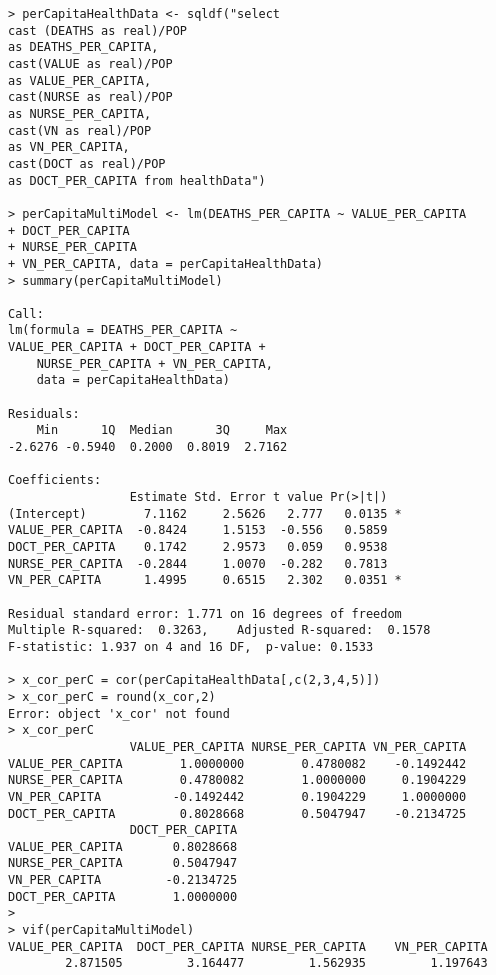 \documentclass[12pt,letterpaper]{article}
\begin{document}
\begin{lstlisting}[label=R Code,caption=Q5(c) R Code Output]
> perCapitaHealthData <- sqldf("select 
cast (DEATHS as real)/POP 
as DEATHS_PER_CAPITA,
cast(VALUE as real)/POP 
as VALUE_PER_CAPITA,
cast(NURSE as real)/POP 
as NURSE_PER_CAPITA,
cast(VN as real)/POP 
as VN_PER_CAPITA,
cast(DOCT as real)/POP 
as DOCT_PER_CAPITA from healthData") 

> perCapitaMultiModel <- lm(DEATHS_PER_CAPITA ~ VALUE_PER_CAPITA 
+ DOCT_PER_CAPITA 
+ NURSE_PER_CAPITA
+ VN_PER_CAPITA, data = perCapitaHealthData)
> summary(perCapitaMultiModel)

Call:
lm(formula = DEATHS_PER_CAPITA ~ 
VALUE_PER_CAPITA + DOCT_PER_CAPITA + 
    NURSE_PER_CAPITA + VN_PER_CAPITA,
    data = perCapitaHealthData)

Residuals:
    Min      1Q  Median      3Q     Max 
-2.6276 -0.5940  0.2000  0.8019  2.7162 

Coefficients:
                 Estimate Std. Error t value Pr(>|t|)  
(Intercept)        7.1162     2.5626   2.777   0.0135 *
VALUE_PER_CAPITA  -0.8424     1.5153  -0.556   0.5859  
DOCT_PER_CAPITA    0.1742     2.9573   0.059   0.9538  
NURSE_PER_CAPITA  -0.2844     1.0070  -0.282   0.7813  
VN_PER_CAPITA      1.4995     0.6515   2.302   0.0351 *

Residual standard error: 1.771 on 16 degrees of freedom
Multiple R-squared:  0.3263,	Adjusted R-squared:  0.1578 
F-statistic: 1.937 on 4 and 16 DF,  p-value: 0.1533

> x_cor_perC = cor(perCapitaHealthData[,c(2,3,4,5)])
> x_cor_perC = round(x_cor,2)
Error: object 'x_cor' not found
> x_cor_perC
                 VALUE_PER_CAPITA NURSE_PER_CAPITA VN_PER_CAPITA
VALUE_PER_CAPITA        1.0000000        0.4780082    -0.1492442
NURSE_PER_CAPITA        0.4780082        1.0000000     0.1904229
VN_PER_CAPITA          -0.1492442        0.1904229     1.0000000
DOCT_PER_CAPITA         0.8028668        0.5047947    -0.2134725
                 DOCT_PER_CAPITA
VALUE_PER_CAPITA       0.8028668
NURSE_PER_CAPITA       0.5047947
VN_PER_CAPITA         -0.2134725
DOCT_PER_CAPITA        1.0000000
> 
> vif(perCapitaMultiModel)
VALUE_PER_CAPITA  DOCT_PER_CAPITA NURSE_PER_CAPITA    VN_PER_CAPITA 
        2.871505         3.164477         1.562935         1.197643 
        \end{lstlisting}
\end{document}
